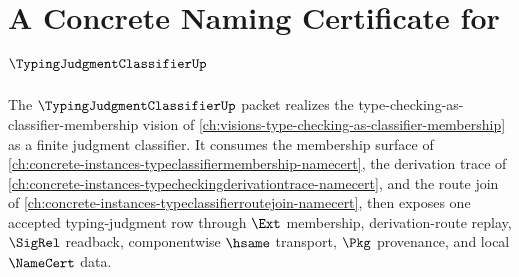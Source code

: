 \chapter{A Concrete Naming Certificate for $\TypingJudgmentClassifierUp$}
\label{ch:concrete-instances-typing-judgment-classifier-namecert}

The $\TypingJudgmentClassifierUp$ packet realizes the type-checking-as-classifier-membership vision of \autoref{ch:visions-type-checking-as-classifier-membership} as a finite judgment classifier. It consumes the membership surface of \autoref{ch:concrete-instances-typeclassifiermembership-namecert}, the derivation trace of \autoref{ch:concrete-instances-typecheckingderivationtrace-namecert}, and the route join of \autoref{ch:concrete-instances-typeclassifierroutejoin-namecert}, then exposes one accepted typing-judgment row through $\Ext$ membership, derivation-route replay, $\SigRel$ readback, componentwise $\hsame$ transport, $\Pkg$ provenance, and local $\NameCert$ data.



